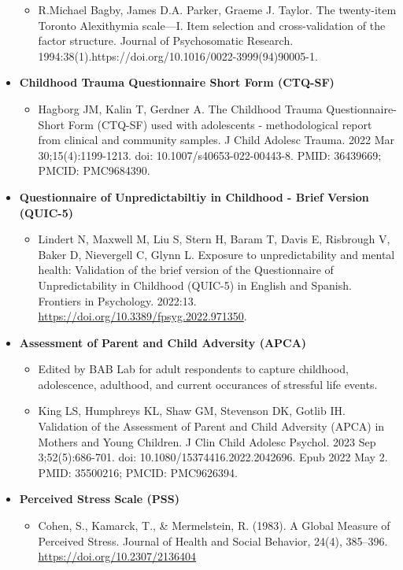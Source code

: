 \documentclass[
]{book}
\providecommand{\tightlist}{%
  \setlength{\itemsep}{0pt}\setlength{\parskip}{0pt}}
\begin{document}
\begin{itemize}
  \begin{itemize}
  \tightlist
  \item
    R.Michael Bagby, James D.A. Parker, Graeme J. Taylor. The twenty-item Toronto Alexithymia scale---I. Item selection and cross-validation of the factor structure. Journal of Psychosomatic Research. 1994:38(1).https://doi.org/10.1016/0022-3999(94)90005-1.
  \end{itemize}
\item
  \textbf{Childhood Trauma Questionnaire Short Form (CTQ-SF)}

  \begin{itemize}
  \tightlist
  \item
    Hagborg JM, Kalin T, Gerdner A. The Childhood Trauma Questionnaire-Short Form (CTQ-SF) used with adolescents - methodological report from clinical and community samples. J Child Adolesc Trauma. 2022 Mar 30;15(4):1199-1213. doi: 10.1007/s40653-022-00443-8. PMID: 36439669; PMCID: PMC9684390.
  \end{itemize}
\item
  \textbf{Questionnaire of Unpredictabiltiy in Childhood - Brief Version (QUIC-5)}

  \begin{itemize}
  \tightlist
  \item
    Lindert N, Maxwell M, Liu S, Stern H, Baram T, Davis E, Risbrough V, Baker D, Nievergell C, Glynn L. Exposure to unpredictability and mental health: Validation of the brief version of the Questionnaire of Unpredictability in Childhood (QUIC-5) in English and Spanish. Frontiers in Psychology. 2022:13. \url{https://doi.org/10.3389/fpsyg.2022.971350}.
  \end{itemize}
\item
  \textbf{Assessment of Parent and Child Adversity (APCA)}

  \begin{itemize}
  \tightlist
  \item
    Edited by BAB Lab for adult respondents to capture childhood, adolescence, adulthood, and current occurances of stressful life events.
  \item
    King LS, Humphreys KL, Shaw GM, Stevenson DK, Gotlib IH. Validation of the Assessment of Parent and Child Adversity (APCA) in Mothers and Young Children. J Clin Child Adolesc Psychol. 2023 Sep 3;52(5):686-701. doi: 10.1080/15374416.2022.2042696. Epub 2022 May 2. PMID: 35500216; PMCID: PMC9626394.
  \end{itemize}
\item
  \textbf{Perceived Stress Scale (PSS)}

  \begin{itemize}
  \tightlist
  \item
    Cohen, S., Kamarck, T., \& Mermelstein, R. (1983). A Global Measure of Perceived Stress. Journal of Health and Social Behavior, 24(4), 385--396. \url{https://doi.org/10.2307/2136404}
  \end{itemize}
\end{itemize}
\end{document}
